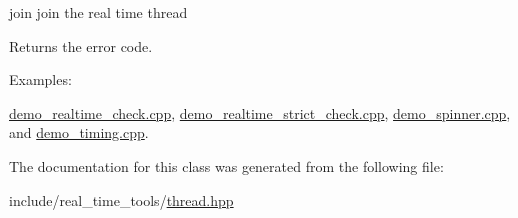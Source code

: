 join join the real time thread 

\begin{DoxyReturn}{Returns}
the error code. 
\end{DoxyReturn}
\begin{Desc}
\item[Examples\+: ]\par
\hyperlink{demo_realtime_check_8cpp-example}{demo\+\_\+realtime\+\_\+check.\+cpp}, \hyperlink{demo_realtime_strict_check_8cpp-example}{demo\+\_\+realtime\+\_\+strict\+\_\+check.\+cpp}, \hyperlink{demo_spinner_8cpp-example}{demo\+\_\+spinner.\+cpp}, and \hyperlink{demo_timing_8cpp-example}{demo\+\_\+timing.\+cpp}.\end{Desc}


The documentation for this class was generated from the following file\+:\begin{DoxyCompactItemize}
\item 
include/real\+\_\+time\+\_\+tools/\hyperlink{thread_8hpp}{thread.\+hpp}\end{DoxyCompactItemize}
